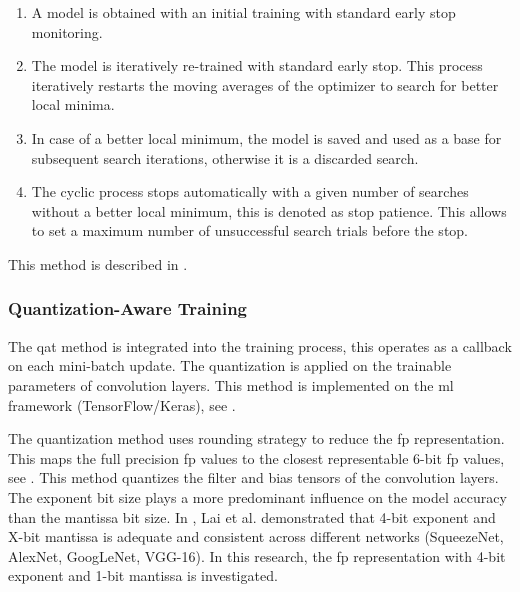 \begin{enumerate}
	\item A model is obtained with an initial training with standard early stop monitoring.
	\item The model is iteratively re-trained with standard early stop. This process iteratively restarts the moving averages of the optimizer to search for better local minima.
	\item In case of a better local minimum, the model is saved and used as a base for subsequent search iterations, otherwise it is a discarded search.
	\item The cyclic process stops automatically with a given number of searches without a better local minimum, this is denoted as stop patience. This allows to set a maximum number of unsuccessful search trials before the stop.
\end{enumerate}

This method is described in .

\subsubsection{Quantization-Aware Training}
The \gls{qat} method is integrated into the training process, this operates as a callback on each mini-batch update. The quantization is applied on the trainable parameters of convolution layers. This method is implemented on the \gls{ml} framework (TensorFlow/Keras), see .

The quantization method uses rounding strategy to reduce the \gls{fp} representation. This maps the full precision \gls{fp} values to the closest representable 6-bit \gls{fp} values, see . This method quantizes the filter and bias tensors of the convolution layers. The exponent bit size plays a more predominant influence on the model accuracy than the mantissa bit size. In \cite{lai2017deep}, Lai et al. demonstrated that 4-bit exponent and X-bit mantissa is adequate and consistent across different networks (SqueezeNet, AlexNet, GoogLeNet, VGG-16). In this research, the \gls{fp} representation with 4-bit exponent and 1-bit mantissa is investigated.

